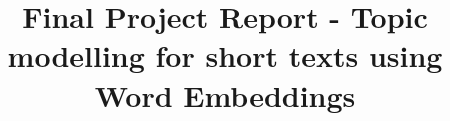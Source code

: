 \documentclass{sig-alternate-05-2015}
\begin{document}






%


\title{Final Project Report - Topic modelling for short texts using Word Embeddings
}

%
%
%
%
%
\end{document}
